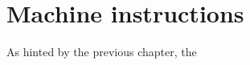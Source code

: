 \chapter{Machine instructions}
\label{chapter:instructions}

As hinted by the previous chapter, the 
